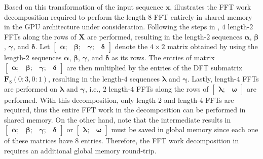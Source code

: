 \documentclass[11pt, onecolumn, journal,compsoc]{IEEEtran}
\theoremstyle{problemstyle}
\begin{document}
  Based on this transformation of the input sequence $\bm{x}$,  illustrates the FFT work decomposition required to perform the length-$8$ FFT entirely in shared memory in the GPU architecture under consideration. Following the steps in , $4$ length-$2$ FFTs along the rows of $\bm{X}$ are performed, resulting in the length-$2$ sequences $\bm{\alpha}$, $\bm{\beta}$, $\bm{\gamma}$, and $\bm{\delta}$. Let $\begin{bmatrix} \bm{\alpha}; & \bm{\beta}; & \bm{\gamma}; & \bm{\delta} \end{bmatrix}$ denote the $4 \times 2$ matrix obtained by using the length-$2$ sequences $\bm{\alpha}$, $\bm{\beta}$, $\bm{\gamma}$, and $\bm{\delta}$ as its rows. The entries of matrix $\begin{bmatrix} \bm{\alpha}; & \bm{\beta}; & \bm{\gamma}; & \bm{\delta} \end{bmatrix}$ are then multiplied by the entries of the DFT submatrix $\bm{F}_8(0:3,0:1)$, resulting in the length-$4$ sequences $\bm{\lambda}$ and $\bm{\gamma}$. Lastly, length-$4$ FFTs are performed on $\bm{\lambda}$ and $\bm{\gamma}$, i.e., $2$ length-$4$ FFTs along the rows of $\begin{bmatrix} \bm{\lambda}; & \bm{\omega} \end{bmatrix}$ are performed. With this decomposition, only length-$2$ and length-$4$ FFTs are required, thus the entire FFT work in the decomposition can be performed in shared memory. On the other hand, note that the intermediate results in $\begin{bmatrix} \bm{\alpha}; & \bm{\beta}; & \bm{\gamma}; & \bm{\delta} \end{bmatrix}$ or $\begin{bmatrix} \bm{\lambda}; & \bm{\omega} \end{bmatrix}$ must be saved in global memory since each one of these matrices have $8$ entries. Therefore, the FFT work decomposition in  requires an additional global memory round-trip.
\end{document}
